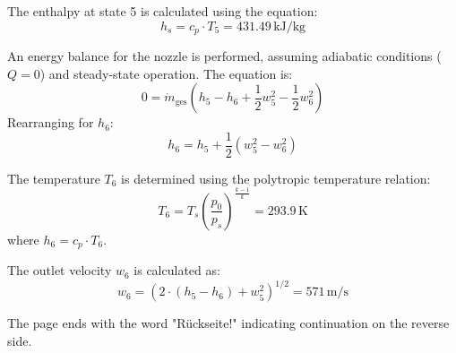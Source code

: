 The enthalpy at state 5 is calculated using the equation:  
\[
h_s = c_p \cdot T_5 = 431.49 \, \text{kJ/kg}
\]  

An energy balance for the nozzle is performed, assuming adiabatic conditions (\( Q = 0 \)) and steady-state operation. The equation is:  
\[
0 = \dot{m}_{\text{ges}} \left( h_5 - h_6 + \frac{1}{2} w_5^2 - \frac{1}{2} w_6^2 \right)
\]  
Rearranging for \( h_6 \):  
\[
h_6 = h_5 + \frac{1}{2} \left( w_5^2 - w_6^2 \right)
\]  

The temperature \( T_6 \) is determined using the polytropic temperature relation:  
\[
T_6 = T_s \left( \frac{p_0}{p_s} \right)^{\frac{k-1}{k}} = 293.9 \, \text{K}
\]  
where \( h_6 = c_p \cdot T_6 \).  

The outlet velocity \( w_6 \) is calculated as:  
\[
w_6 = \left( 2 \cdot (h_5 - h_6) + w_5^2 \right)^{1/2} = 571 \, \text{m/s}
\]  

The page ends with the word "Rückseite!" indicating continuation on the reverse side.